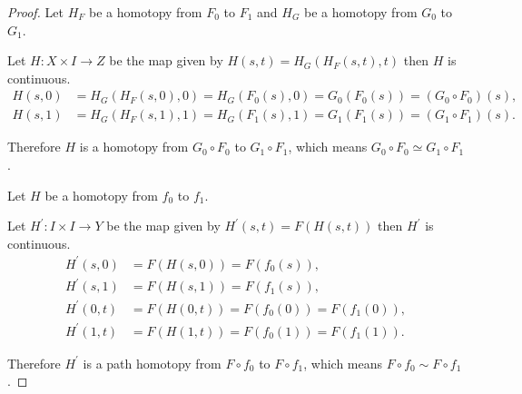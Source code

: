 \begin{proof}
    Let \( H_{F} \) be a homotopy from \( F_{0} \) to \( F_{1} \) and \( H_{G} \) be a homotopy from \( G_{0} \) to \( G_{1} \).

    Let \( H: X \times I \to Z \) be the map given by \( H(s, t) = H_{G}(H_{F}(s, t), t) \) then \( H \) is continuous.
    \begingroup
    \allowdisplaybreaks%
    \begin{align*}
        H(s, 0) & = H_{G}(H_{F}(s, 0), 0) = H_{G}(F_{0}(s), 0) = G_{0}(F_{0}(s)) = (G_{0} \circ F_{0})(s), \\
        H(s, 1) & = H_{G}(H_{F}(s, 1), 1) = H_{G}(F_{1}(s), 1) = G_{1}(F_{1}(s)) = (G_{1} \circ F_{1})(s).
    \end{align*}
    \endgroup

    Therefore \( H \) is a homotopy from \( G_{0} \circ F_{0} \) to \( G_{1} \circ F_{1} \), which means \( G_{0} \circ F_{0} \simeq G_{1} \circ F_{1} \).

    \hrulefill%

    Let \( H \) be a homotopy from \( f_{0} \) to \( f_{1} \).

    Let \( H^{\prime}: I \times I \to Y \) be the map given by \( H^{\prime}(s, t) = F(H(s, t)) \) then \( H^{\prime} \) is continuous.
    \begingroup
    \allowdisplaybreaks%
    \begin{align*}
        H^{\prime}(s, 0) & = F(H(s, 0)) = F(f_{0}(s)),               \\
        H^{\prime}(s, 1) & = F(H(s, 1)) = F(f_{1}(s)),               \\
        H^{\prime}(0, t) & = F(H(0, t)) = F(f_{0}(0)) = F(f_{1}(0)), \\
        H^{\prime}(1, t) & = F(H(1, t)) = F(f_{0}(1)) = F(f_{1}(1)).
    \end{align*}
    \endgroup

    Therefore \( H^{\prime} \) is a path homotopy from \( F \circ f_{0} \) to \( F \circ f_{1} \), which means \( F \circ f_{0} \sim F \circ f_{1} \).
\end{proof}


